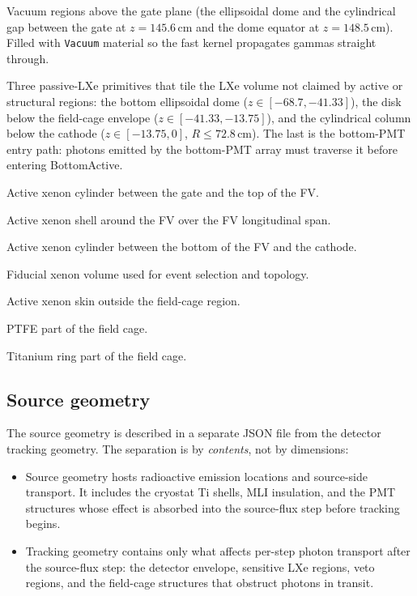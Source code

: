 \documentclass[11pt]{article}
\begin{document}
\begin{description}[leftmargin=2.0cm,style=nextline]
\item[\texttt{AirDome}, \texttt{AirCyl}] Vacuum regions above the gate
plane (the ellipsoidal dome and the cylindrical gap between the gate at
$z = 145.6$\,cm and the dome equator at $z = 148.5$\,cm). Filled with
\texttt{Vacuum} material so the fast kernel propagates gammas straight
through.
\item[\texttt{LXe\_dome}, \texttt{LXe\_below\_FC}, \texttt{LXe\_below\_cathode}]
Three passive-LXe primitives that tile the LXe volume not claimed by
active or structural regions: the bottom ellipsoidal dome
($z \in [-68.7, -41.33]$), the disk below the field-cage envelope
($z \in [-41.33, -13.75]$), and the cylindrical column below the
cathode ($z \in [-13.75, 0]$, $R \le 72.8$\,cm). The last is the
bottom-PMT entry path: photons emitted by the bottom-PMT array must
traverse it before entering BottomActive.
\item[\texttt{TopActive}] Active xenon cylinder between the gate and the top of
the FV.
\item[\texttt{BarrelActive}] Active xenon shell around the FV over the FV
longitudinal span.
\item[\texttt{BottomActive}] Active xenon cylinder between the bottom of the FV
and the cathode.
\item[\texttt{FV}] Fiducial xenon volume used for event selection and topology.
\item[\texttt{Skin}] Active xenon skin outside the field-cage region.
\item[\texttt{FC\_PTFE}] PTFE part of the field cage.
\item[\texttt{FC\_rings}] Titanium ring part of the field cage.
\end{description}

\subsection{Source geometry}

The source geometry is described in a separate JSON file from the detector
tracking geometry. The separation is by \emph{contents}, not by dimensions:

\begin{itemize}
\item Source geometry hosts radioactive emission locations and source-side
      transport. It includes the cryostat Ti shells, MLI insulation, and the
      PMT structures whose effect is absorbed into the source-flux step before
      tracking begins.
\item Tracking geometry contains only what affects per-step photon transport
      after the source-flux step: the detector envelope, sensitive LXe regions,
      veto regions, and the field-cage structures that obstruct photons in
      transit.
\end{itemize}
\end{document}

